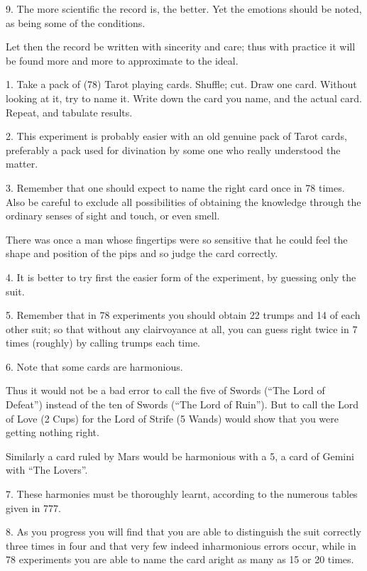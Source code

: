 9. The more scientific the record is, the better. Yet the emotions should be noted, as being some of the conditions.

Let then the record be written with sincerity and care; thus with practice it will be found more and more to approximate to the ideal.



1. Take a pack of (78) Tarot playing cards. Shuffle; cut. Draw one card. Without looking at it, try to name it. Write down the card you name, and the actual card. Repeat, and tabulate results.

2. This experiment is probably easier with an old genuine pack of Tarot cards, preferably a pack used for divination by some one who really understood the matter.

3. Remember that one should expect to name the right card once in 78 times. Also be careful to exclude all possibilities of obtaining the knowledge through the ordinary senses of sight and touch, or even smell.

There was once a man whose fingertips were so sensitive that he could feel the shape and position of the pips and so judge the card correctly.

4. It is better to try first the easier form of the experiment, by guessing only the suit.

5. Remember that in 78 experiments you should obtain 22 trumps and 14 of each other suit; so that without any clairvoyance at all, you can guess right twice in 7 times (roughly) by calling trumps each time.

6. Note that some cards are harmonious.

Thus it would not be a bad error to call the five of Swords (\enquote{The Lord of Defeat}) instead of the ten of Swords (\enquote{The Lord of Ruin}). But to call the Lord of Love (2 Cups) for the Lord of Strife (5 Wands) would show that you were getting nothing right.

Similarly a card ruled by Mars would be harmonious with a 5, a card of Gemini with \enquote{The Lovers}.

7. These harmonies must be thoroughly learnt, according to the numerous tables given in 777.

8. As you progress you will find that you are able to distinguish the suit correctly three times in four and that very few indeed inharmonious errors occur, while in 78 experiments you are able to name the card aright as many as 15 or 20 times.


